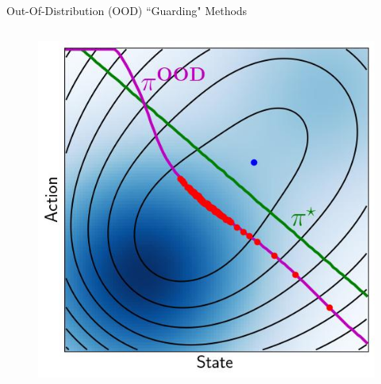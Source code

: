 \documentclass[lecture]{beamer}
\begin{document}
\begin{frame}{\normalsize Out-Of-Distribution (OOD) ``Guarding" Methods}
\begin{columns}[t]
\begin{overlayarea}{\textwidth}{0.5\textheight}
\begin{figure}
{        }
        {%
         \includegraphics[width=\FS\textwidth,clip]{Codes/Epistemic/OOD_OOD.jpeg}
        }
        \end{figure}
        \end{overlayarea}
\end{columns}

     
       \end{frame}
\end{document}
